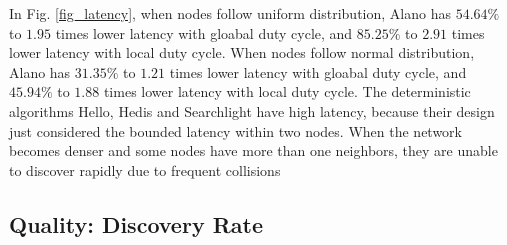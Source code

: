 In Fig. \ref{fig_latency}, when nodes follow uniform distribution, Alano has $54.64\%$ to $1.95$ times lower latency with gloabal duty cycle, and $85.25\%$ to $2.91$ times lower latency with local duty cycle. 
When nodes follow normal distribution, Alano has $31.35\%$ to $1.21$ times lower latency with gloabal duty cycle, and $45.94\%$ to $1.88$ times lower latency with local duty cycle. 
The deterministic algorithms Hello, Hedis and Searchlight have high latency, because their design just considered the bounded latency within two nodes. When the network becomes denser and some nodes have more than one neighbors, they are unable to discover rapidly due to frequent collisions


\subsection{Quality: Discovery Rate}





